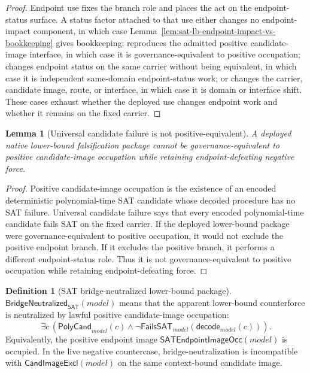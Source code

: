 \documentclass[11pt]{article}
\newtheorem{lemma}[theorem]{Lemma}
\theoremstyle{definition}
\newtheorem{definition}[theorem]{Definition}
\theoremstyle{remark}
\newcommand{\CandImageExcl}{\mathsf{CandImageExcl}}
\newcommand{\SATEndpointImageOcc}{\mathsf{SATEndpointImageOcc}}
\newcommand{\BridgeNeutralizedSAT}{\mathsf{BridgeNeutralized}_{\mathsf{SAT}}}
\begin{document}
\begin{proof}
Endpoint use fixes the branch role and places the act on the endpoint-status surface. A status factor attached to that use either changes no endpoint-impact component, in which case Lemma~\ref{lem:sat-lb-endpoint-impact-vs-bookkeeping} gives bookkeeping; reproduces the admitted positive candidate-image interface, in which case it is governance-equivalent to positive occupation; changes endpoint status on the same carrier without being equivalent, in which case it is independent same-domain endpoint-status work; or changes the carrier, candidate image, route, or interface, in which case it is domain or interface shift. These cases exhaust whether the deployed use changes endpoint work and whether it remains on the fixed carrier.
\end{proof}

\begin{lemma}[Universal candidate failure is not positive-equivalent]\label{lem:deployed-universal-failure-not-positive-equivalent}
A deployed native lower-bound falsification package cannot be governance-equivalent to positive candidate-image occupation while retaining endpoint-defeating negative force.
\end{lemma}

\begin{proof}
Positive candidate-image occupation is the existence of an encoded deterministic polynomial-time SAT candidate whose decoded procedure has no SAT failure. Universal candidate failure says that every encoded polynomial-time candidate fails SAT on the fixed carrier. If the deployed lower-bound package were governance-equivalent to positive occupation, it would not exclude the positive endpoint branch. If it excludes the positive branch, it performs a different endpoint-status role. Thus it is not governance-equivalent to positive occupation while retaining endpoint-defeating force.
\end{proof}

\begin{definition}[SAT bridge-neutralized lower-bound package]\label{def:sat-bridge-neutralized-lower-bound}
\(\BridgeNeutralizedSAT(model)\) means that the apparent lower-bound counterforce is neutralized by lawful positive candidate-image occupation:
\[
  \exists c\,(\mathsf{PolyCand}_{model}(c)\wedge
  \neg\mathsf{FailsSAT}_{model}(\mathsf{decode}_{model}(c))).
\]
Equivalently, the positive endpoint image \(\SATEndpointImageOcc(model)\) is occupied. In the live negative countercase, bridge-neutralization is incompatible with \(\CandImageExcl(model)\) on the same context-bound candidate image.
\end{definition}
\end{document}
